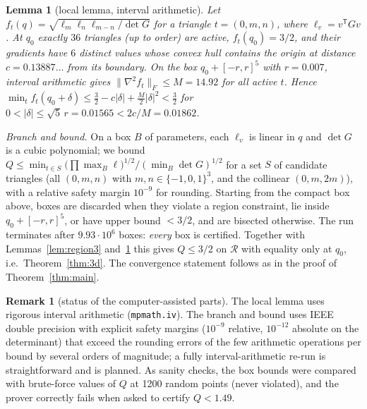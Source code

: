 \documentclass[11pt,a4paper]{amsart}
\newtheorem{lemma}[theorem]{Lemma}
\theoremstyle{definition}
\newtheorem{remark}[theorem]{Remark}
\begin{document}
\begin{lemma}[local lemma, interval arithmetic]\label{lem:local3}
Let $f_t(q)=\sqrt{\ell_{m}\ell_{n}\ell_{m-n}/\det G}$ for a triangle $t=(0,m,n)$, where $\ell_v=v^{\mathsf T}Gv$. At $q_0$ exactly $36$ triangles (up to order) are active, $f_t(q_0)=3/2$, and their gradients have $6$ distinct values whose convex hull contains the origin at distance $c=0.13887\ldots$ from its boundary. On the box $q_0+[-r,r]^5$ with $r=0.007$, interval arithmetic gives $\|\nabla^2f_t\|_F\le M=14.92$ for all active $t$. Hence $\min_tf_t(q_0+\delta)\le\tfrac32-c|\delta|+\tfrac M2|\delta|^2<\tfrac32$ for $0<|\delta|\le\sqrt5\,r=0.01565<2c/M=0.01862$.
\end{lemma}

\noindent\emph{Branch and bound.} On a box $B$ of parameters, each $\ell_v$ is linear in $q$ and $\det G$ is a cubic polynomial; we bound $Q\le\min_{t\in S}\bigl(\prod\max_B\ell\bigr)^{1/2}/(\min_B\det G)^{1/2}$ for a set $S$ of candidate triangles (all $(0,m,n)$ with $m,n\in\{-1,0,1\}^3$, and the collinear $(0,m,2m)$), with a relative safety margin $10^{-9}$ for rounding. Starting from the compact box above, boxes are discarded when they violate a region constraint, lie inside $q_0+[-r,r]^5$, or have upper bound $<3/2$, and are bisected otherwise. The run terminates after $9.93\cdot10^6$ boxes: \emph{every} box is certified.
Together with Lemmas~\ref{lem:region3} and~\ref{lem:local3} this gives $Q\le3/2$ on $\mathcal R$ with equality only at $q_0$, i.e.\ Theorem~\ref{thm:3d}. The convergence statement follows as in the proof of Theorem~\ref{thm:main}.

\begin{remark}[status of the computer-assisted parts]
The local lemma uses rigorous interval arithmetic (\texttt{mpmath.iv}). The branch and bound uses IEEE double precision with explicit safety margins ($10^{-9}$ relative, $10^{-12}$ absolute on the determinant) that exceed the rounding errors of the few arithmetic operations per bound by several orders of magnitude; a fully interval-arithmetic re-run is straightforward and is planned. As sanity checks, the box bounds were compared with brute-force values of $Q$ at 1200 random points (never violated), and the prover correctly fails when asked to certify $Q<1.49$.
\end{remark}
\end{document}
